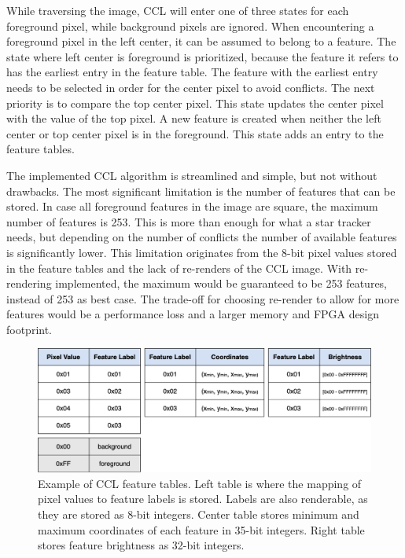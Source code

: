 \documentclass[12pt]{report}
\begin{document}
\par
While traversing the image, CCL will enter one of three states for each foreground pixel, while background pixels are ignored. When encountering a foreground pixel in the left center, it can be assumed to belong to a feature. The state where left center is foreground is prioritized, because the feature it refers to has the earliest entry in the feature table. The feature with the earliest entry needs to be selected in order for the center pixel to avoid conflicts. The next priority is to compare the top center pixel. This state updates the center pixel with the value of the top pixel. A new feature is created when neither the left center or top center pixel is in the foreground. This state adds an entry to the feature tables. \citep{stpp}
\par
The implemented CCL algorithm is streamlined and simple, but not without drawbacks. The most significant limitation is the number of features that can be stored. In case all foreground features in the image are square, the maximum number of features is 253. This is more than enough for what a star tracker needs, but depending on the number of conflicts the number of available features is significantly lower. This limitation originates from the 8-bit pixel values stored in the feature tables and the lack of re-renders of the CCL image. With re-rendering implemented, the maximum would be guaranteed to be 253 features, instead of 253 as best case. The trade-off for choosing re-render to allow for more features would be a performance loss and a larger memory and FPGA design footprint. \citep{stpp}

\begin{figure}[h]
    \centering
    \includegraphics[scale=0.35]{figures/feature_tables.png}
    \caption{Example of CCL feature tables. Left table is where the mapping of pixel values to feature labels is stored. Labels are also renderable, as they are stored as 8-bit integers. Center table stores minimum and maximum coordinates of each feature in 35-bit integers. Right table stores feature brightness as 32-bit integers.}
    \label{fig:feature_tables}
\end{figure}
\end{document}
